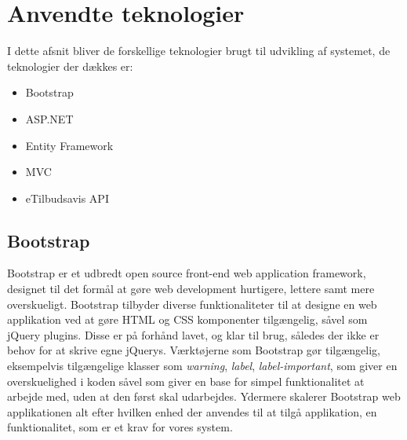 \section{Anvendte teknologier}
I dette afsnit bliver de forskellige teknologier brugt til udvikling af systemet, de teknologier der dækkes er:
\begin {itemize}
  \item Bootstrap
  \item ASP.NET
  \item Entity Framework
  \item MVC
  \item eTilbudsavis API
\end {itemize}

\subsection{Bootstrap}
Bootstrap er et udbredt open source front-end web application framework, designet til det formål at gøre web development hurtigere, lettere samt mere overskueligt.
Bootstrap tilbyder diverse funktionaliteter til at designe en web applikation ved at gøre HTML og CSS komponenter tilgængelig, såvel som jQuery plugins.
Disse er på forhånd lavet, og klar til brug, således der ikke er behov for at skrive egne jQuerys.
Værktøjerne som Bootstrap gør tilgængelig, eksempelvis tilgængelige klasser som \textit{warning}, \textit{label}, \textit{label-important}, som giver en overskuelighed i koden såvel som giver en base for simpel funktionalitet at arbejde med, uden at den først skal udarbejdes.
Ydermere skalerer Bootstrap web applikationen alt efter hvilken enhed der anvendes til at tilgå applikation, en funktionalitet, som er et krav for vores system.

